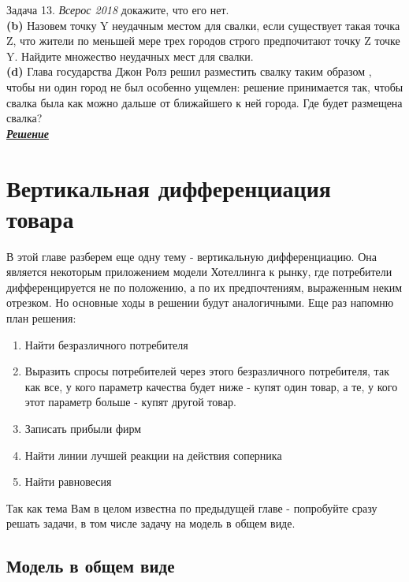 \begin{mybox}{Задача 13. \textit{Всерос 2018}}
    докажите, что его нет.\smallskip\\
    \indent\setlength{\parindent}{1em}\textbf{(b)} Назовем точку Y неудачным местом для свалки, если существует такая
    точка Z, что жители по меньшей мере трех городов строго предпочитают точку Z точке Y. Найдите множество неудачных
    мест для свалки.\smallskip\\
    \indent\setlength{\parindent}{1em}\textbf{(d)} Глава государства Джон Ролз решил разместить свалку таким образом
    , чтобы ни один город не был особенно ущемлен: решение принимается так, чтобы свалка была как можно дальше от
    ближайшего к ней города. Где будет размещена свалка?\bigskip\\
    \textit{\textbf{\centering\href{https://iloveeconomics.ru/sites/default/files/olimp/vseros/2018/vseros_2018_vseros_10-11_klass_1_tur_resheniya_18405.pdf}{Решение}}}
\end{mybox}



\chapter{Вертикальная дифференциация товара}

\indent\setlength{\parindent}{1em}\indent\setlength{\parindent}{1em}В этой главе разберем еще одну тему - вертикальную
дифференциацию. Она является некоторым приложением модели Хотеллинга к рынку, где потребители дифференцируется не по
положению, а по их предпочтениям, выраженным неким отрезком. Но основные ходы в решении будут аналогичными. Еще раз
напомню план решения:
\begin{enumerate}
    \item Найти безразличного потребителя
    \item Выразить спросы потребителей через этого безразличного потребителя, так как все, у кого параметр качества
    будет ниже - купят один товар, а те, у кого этот параметр больше - купят другой товар.
    \item Записать прибыли фирм
    \item Найти линии лучшей реакции на действия соперника
    \item Найти равновесия
\end{enumerate}
\indent\setlength{\parindent}{1em}Так как тема Вам в целом известна по предыдущей главе - попробуйте сразу решать
задачи, в том числе задачу на модель в общем виде.


\section{Модель в общем виде}

